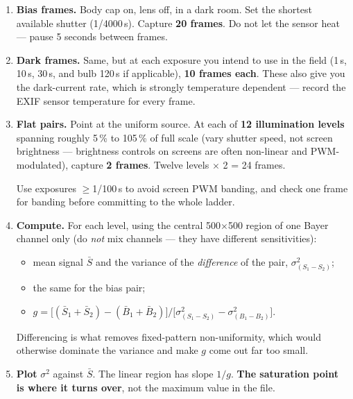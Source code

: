 \documentclass[11pt]{article}
\begin{document}
\begin{enumerate}
\item \textbf{Bias frames.} Body cap on, lens off, in a dark room. Set the
      shortest available shutter (1/4000\,s). Capture \textbf{20 frames}. Do
      not let the sensor heat --- pause 5 seconds between frames.

\item \textbf{Dark frames.} Same, but at each exposure you intend to use in the
      field (1\,s, 10\,s, 30\,s, and bulb 120\,s if applicable), \textbf{10
      frames each}. These also give you the dark-current rate, which is
      strongly temperature dependent --- record the EXIF sensor temperature for
      every frame.

\item \textbf{Flat pairs.} Point at the uniform source. At each of
      \textbf{12 illumination levels} spanning roughly 5\,\% to 105\,\% of full
      scale (vary shutter speed, not screen brightness --- brightness controls
      on screens are often non-linear and PWM-modulated), capture
      \textbf{2 frames}. Twelve levels $\times$ 2 = 24 frames.

      Use exposures $\geq$1/100\,s to avoid screen PWM banding, and check one
      frame for banding before committing to the whole ladder.

\item \textbf{Compute.} For each level, using the central 500$\times$500 region
      of one Bayer channel only (do \emph{not} mix channels --- they have
      different sensitivities):
      \begin{itemize}
      \item mean signal $\bar{S}$ and the variance of the \emph{difference}
            of the pair, $\sigma^2_{(S_1-S_2)}$;
      \item the same for the bias pair;
      \item $g = \big[(\bar{S}_1 + \bar{S}_2) - (\bar{B}_1 + \bar{B}_2)\big] \big/ \big[\sigma^2_{(S_1-S_2)} - \sigma^2_{(B_1-B_2)}\big]$.
      \end{itemize}
      Differencing is what removes fixed-pattern non-uniformity, which would
      otherwise dominate the variance and make $g$ come out far too small.

\item \textbf{Plot} $\sigma^2$ against $\bar{S}$. The linear region has slope
      $1/g$. \textbf{The saturation point is where it turns over}, not the
      maximum value in the file.


\end{enumerate}
\end{document}
